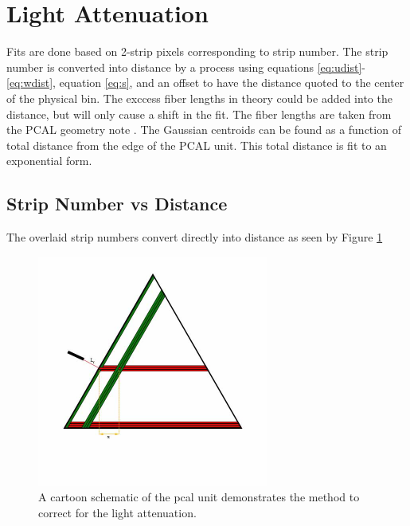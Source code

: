 \section{Light Attenuation}
Fits are done based on 2-strip pixels corresponding to strip number. 
The strip number is converted into distance by a process using equations \ref{eq:udist}-\ref{eq:wdist}, 
equation \ref{eq:s}, and an offset to have the distance quoted to the center of the physical bin. 
The exccess fiber lengths in theory could be added into the distance, but will only cause a shift in the fit.
The fiber lengths are taken from the PCAL geometry note \cite{bib:geomnote}. 
The Gaussian centroids can be found as a function of total distance from the edge of the PCAL unit.
This total distance is fit to an exponential form. 




\subsection{Strip Number vs Distance}
\FloatBarrier

The overlaid strip numbers convert directly into distance as seen by Figure \ref{fig:lowqualdist}

\begin{figure}[h]
\centering
\includegraphics[height= 3in, keepaspectratio = true]{lowqualitydiagram}
\caption{A cartoon schematic of the pcal unit demonstrates the method to correct for the light attenuation.}
\label{fig:lowqualdist}
\end{figure}





